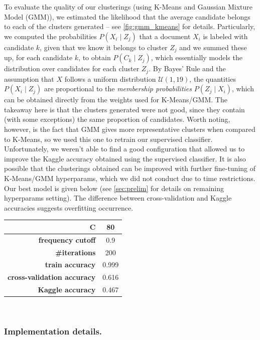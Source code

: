 \documentclass[11pt]{article}
\begin{document}
To evaluate the quality of our clusterings (using K-Means and Gaussian Mixture Model (GMM)), we estimated the likelihood that the average candidate belongs to each of the clusters generated -- see \cref{fig:gmm_kmeans} for details. Particularly, we computed the probabilities $P(X_i \mid Z_j)$ that a document $X_i$ is labeled with candidate $k$, given that we know it belongs to cluster $Z_j$ and we summed these up, for each candidate $k$, to obtain $P(C_k \mid Z_j)$, which essentially models the distribution over candidates for each cluster $Z_j$. By Bayes' Rule and the assumption that $X$ follows a uniform distribution $\mathcal{U}(1,19)$, the quantities $P(X_i \mid Z_j)$ are proportional to the \emph{membership probabilities} $P(Z_j \mid X_i)$, which can be obtained directly from the weights used for K-Means/GMM. The takeaway here is that the clusters generated were not good, since they contain (with some exceptions) the same proportion of candidates. Worth noting, however, is the fact that GMM gives more representative clusters when compared to K-Means, so we used this one to retrain our supervised classifier. Unfortunately, we weren't able to find a good configuration that allowed us to improve the Kaggle accuracy obtained using the supervised classifier. It is also possible that the clusterings obtained can be improved with further fine-tuning of K-Means/GMM hyperparams, which we did not conduct due to time restrictions. Our best model is given below (see \cref{sec:prelim} for details on remaining hyperparams setting). The difference between cross-validation and Kaggle accuracies suggests overfitting occurrence.

\begin{center}
\begin{tabular}{r|c}
  $\mathbf{C}$ & 80 \\\hline 
  \textbf{frequency cutoff} & 0.9 \\\hline
  \textbf{\#iterations} & 200 \\\hline
  \textbf{train accuracy} & 0.999 \\\hline
  \textbf{cross-validation accuracy} & 0.616 \\\hline
  \textbf{Kaggle accuracy}  & 0.467
\end{tabular}
\end{center}

~

\subsubsection*{Implementation details.}
\end{document}
